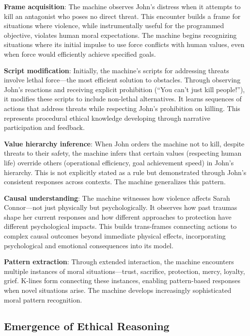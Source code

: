 \documentclass[12pt]{article}
\begin{document}
\textbf{Frame acquisition}: The machine observes John's distress when it attempts to kill an antagonist who poses no direct threat. This encounter builds a frame for situations where violence, while instrumentally useful for the programmed objective, violates human moral expectations. The machine begins recognizing situations where its initial impulse to use force conflicts with human values, even when force would efficiently achieve specified goals.

\textbf{Script modification}: Initially, the machine's scripts for addressing threats involve lethal force---the most efficient solution to obstacles. Through observing John's reactions and receiving explicit prohibition (``You can't just kill people!''), it modifies these scripts to include non-lethal alternatives. It learns sequences of actions that address threats while respecting John's prohibition on killing. This represents procedural ethical knowledge developing through narrative participation and feedback.

\textbf{Value hierarchy inference}: When John orders the machine not to kill, despite threats to their safety, the machine infers that certain values (respecting human life) override others (operational efficiency, goal achievement speed) in John's hierarchy. This is not explicitly stated as a rule but demonstrated through John's consistent responses across contexts. The machine generalizes this pattern.

\textbf{Causal understanding}: The machine witnesses how violence affects Sarah Connor---not just physically but psychologically. It observes how past traumas shape her current responses and how different approaches to protection have different psychological impacts. This builds trans-frames connecting actions to complex causal outcomes beyond immediate physical effects, incorporating psychological and emotional consequences into its model.

\textbf{Pattern extraction}: Through extended interaction, the machine encounters multiple instances of moral situations---trust, sacrifice, protection, mercy, loyalty, grief. K-lines form connecting these instances, enabling pattern-based responses when novel situations arise. The machine develops increasingly sophisticated moral pattern recognition.

\subsection{Emergence of Ethical Reasoning}
\end{document}
